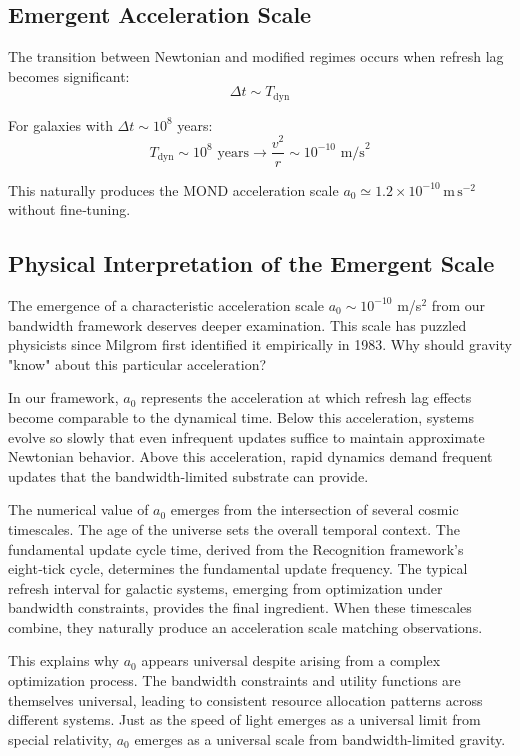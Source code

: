 \documentclass[twocolumn,prd,amsmath,amssymb,aps,superscriptaddress,nofootinbib]{revtex4-2}
\begin{document}
\subsection{Emergent Acceleration Scale}

The transition between Newtonian and modified regimes occurs when refresh lag becomes significant:
\begin{equation}
\Delta t \sim T_{\text{dyn}}
\end{equation}

For galaxies with $\Delta t \sim 10^8$ years:
\begin{equation}
T_{\text{dyn}} \sim 10^8 \text{ years} \rightarrow \frac{v^2}{r} \sim 10^{-10} \text{ m/s}^2
\end{equation}

This naturally produces the MOND acceleration scale $a_0 \simeq 1.2\times10^{-10}\,\mathrm{m\,s^{-2}}$ without fine‑tuning.

\subsection{Physical Interpretation of the Emergent Scale}

The emergence of a characteristic acceleration scale $a_0 \sim 10^{-10}$ m/s$^2$ from our bandwidth framework deserves deeper examination. This scale has puzzled physicists since Milgrom first identified it empirically in 1983. Why should gravity "know" about this particular acceleration?

In our framework, $a_0$ represents the acceleration at which refresh lag effects become comparable to the dynamical time. Below this acceleration, systems evolve so slowly that even infrequent updates suffice to maintain approximate Newtonian behavior. Above this acceleration, rapid dynamics demand frequent updates that the bandwidth-limited substrate can provide.

The numerical value of $a_0$ emerges from the intersection of several cosmic timescales. The age of the universe sets the overall temporal context. The fundamental update cycle time, derived from the Recognition framework's eight‑tick cycle, determines the fundamental update frequency. The typical refresh interval for galactic systems, emerging from optimization under bandwidth constraints, provides the final ingredient. When these timescales combine, they naturally produce an acceleration scale matching observations.

This explains why $a_0$ appears universal despite arising from a complex optimization process. The bandwidth constraints and utility functions are themselves universal, leading to consistent resource allocation patterns across different systems. Just as the speed of light emerges as a universal limit from special relativity, $a_0$ emerges as a universal scale from bandwidth-limited gravity.
\end{document}

